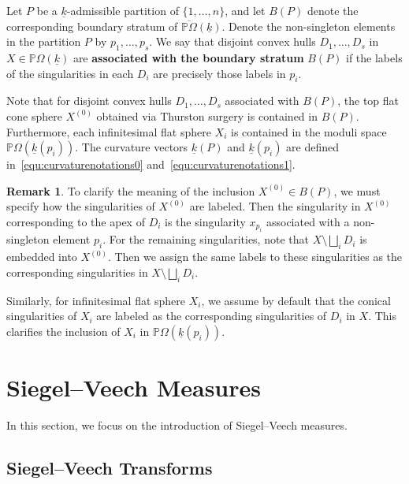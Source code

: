 \documentclass{compositio}
\numberwithin{equation}{section}
\numberwithin{figure}{section}
\theoremstyle{definition}
\newtheorem{remark}[definition]{Remark}
\theoremstyle{plain}
\begin{document}
{Let $P$ be a $\underline{k}$-admissible partition of $\{1,\ldots,n\}$, and let $B(P)$ denote the corresponding boundary stratum of $\overline{\mathbb{P}\Omega}(\underline{k})$. Denote the non-singleton elements in the partition $P$ by $p_1, \ldots, p_s$. We say that disjoint convex hulls $D_1, \ldots, D_s$ in $X \in \mathbb{P}\Omega(\underline{k})$ are \textbf{associated with the boundary stratum} $B(P)$ if the labels of the singularities in each $D_i$ are precisely those labels in $p_i$. 

Note that for disjoint convex hulls $D_1, \ldots, D_s$ associated with $B(P)$, the top flat cone sphere $X^{(0)}$ obtained via Thurston surgery is contained in $B(P)$. Furthermore, each infinitesimal flat sphere $X_i$ is contained in the moduli space $\mathbb{P}\Omega(\underline{k}(p_i))$. The curvature vectors $\underline{k}(P)$ and $\underline{k}(p_i)$ are defined in~\eqref{equ:curvaturenotations0} and~\eqref{equ:curvaturenotations1}. 

\begin{remark}\label{rmk:canonicallabels}
To clarify the meaning of the inclusion $X^{(0)} \in B(P)$, we must specify how the singularities of $X^{(0)}$ are labeled. Then the singularity in $X^{(0)}$ corresponding to the apex of $D_i$ is the singularity $x_{p_i}$ associated with a non-singleton element $p_i$. For the remaining singularities, note that $X \setminus \bigsqcup_i D_i$ is embedded into $X^{(0)}$. Then we assign the same labels to these singularities as the corresponding singularities in $X \setminus \bigsqcup_i D_i$. 

Similarly, for infinitesimal flat sphere $X_i$, we assume by default that the conical singularities of $X_i$ are labeled as the corresponding singularities of $D_i$ in $X$. This clarifies the inclusion of $X_i$ in $\mathbb{P}\Omega(\underline{k}(p_i))$.
\end{remark}



\section{Siegel--Veech Measures}\label{bigsec:siegelveechmeasure}

In this section, we focus on the introduction of Siegel--Veech measures.

\subsection{Siegel--Veech Transforms}\label{sec:integrablity}

}
\end{document}
